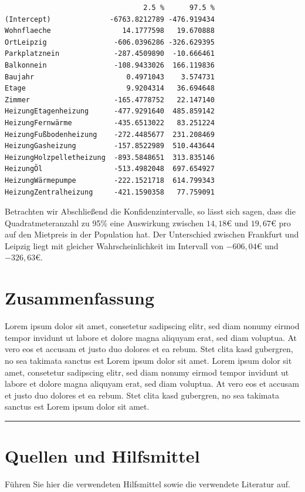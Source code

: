 \documentclass[
  a4paper,
  DIV=11]{scrartcl}
\begin{document}
\begin{verbatim}
                                 2.5 %      97.5 %
(Intercept)              -6763.8212789 -476.919434
Wohnflaeche                 14.1777598   19.670888
OrtLeipzig                -606.0396286 -326.629395
Parkplatznein             -287.4509890  -10.666461
Balkonnein                -108.9433026  166.119836
Baujahr                      0.4971043    3.574731
Etage                        9.9204314   36.694648
Zimmer                    -165.4778752   22.147140
HeizungEtagenheizung      -477.9291640  485.859142
HeizungFernwärme          -435.6513022   83.251224
HeizungFußbodenheizung    -272.4485677  231.208469
HeizungGasheizung         -157.8522989  510.443644
HeizungHolzpelletheizung  -893.5848651  313.835146
HeizungÖl                 -513.4982048  697.654927
HeizungWärmepumpe         -222.1521718  614.799343
HeizungZentralheizung     -421.1590358   77.759091
\end{verbatim}

Betrachten wir Abschließend die Konfidenzintervalle, so lässt sich
sagen, dass die Quadratmeteranzahl zu 95\% eine Auswirkung zwischen
\(14,18€\) und \(19,67€\) pro auf den Mietpreis in der Population hat.
Der Unterschied zwischen Frankfurt und Leipzig liegt mit gleicher
Wahrscheinlichkeit im Intervall von \(-606,04€\) und \(-326,63€\).

\hypertarget{zusammenfassung}{%
\section{Zusammenfassung}\label{zusammenfassung}}

Lorem ipsum dolor sit amet, consetetur sadipscing elitr, sed diam nonumy
eirmod tempor invidunt ut labore et dolore magna aliquyam erat, sed diam
voluptua. At vero eos et accusam et justo duo dolores et ea rebum. Stet
clita kasd gubergren, no sea takimata sanctus est Lorem ipsum dolor sit
amet. Lorem ipsum dolor sit amet, consetetur sadipscing elitr, sed diam
nonumy eirmod tempor invidunt ut labore et dolore magna aliquyam erat,
sed diam voluptua. At vero eos et accusam et justo duo dolores et ea
rebum. Stet clita kasd gubergren, no sea takimata sanctus est Lorem
ipsum dolor sit amet.

\begin{center}\rule{0.5\linewidth}{0.5pt}\end{center}

\hypertarget{quellen-und-hilfsmittel}{%
\section{Quellen und Hilfsmittel}\label{quellen-und-hilfsmittel}}

Führen Sie hier die verwendeten Hilfsmittel sowie die verwendete
Literatur auf.
\end{document}
